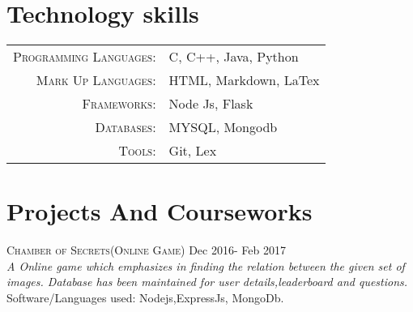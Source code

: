\documentclass[a4paper,10pt]{article}
\begin{document}
\section{Technology skills}
\begin{tabular}{rl}
 \textsc{Programming Languages:}& C, C++, Java, Python\\
\textsc{Mark Up Languages:}& HTML, Markdown, LaTex\\
\textsc{Frameworks:}& Node Js, Flask\\
\textsc{Databases:}& MYSQL, Mongodb\\
\textsc{Tools:}& Git, Lex\\
\end{tabular}

\section{Projects And Courseworks}
{\textsc{ Chamber of Secrets(Online Game)} \hfill Dec 2016- Feb 2017 \\
\emph{
A Online game which emphasizes in finding the relation between the given set of images. Database has been maintained for user details,leaderboard and questions. 
}\\  
Software/Languages used: Nodejs,ExpressJs, MongoDb.} \\
\end{document}
